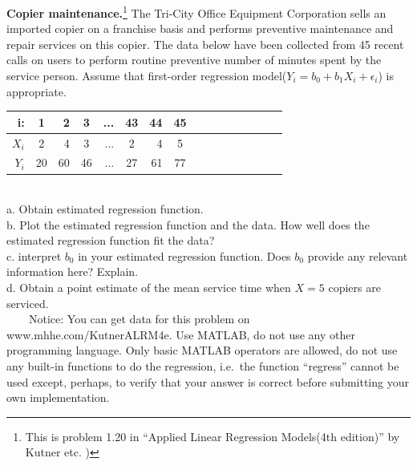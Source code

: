 \documentclass[12pt]{article}
\begin{document}
 { \textbf{Copier maintenance.}\footnote[1]{This is
problem 1.20 in ``Applied Linear Regression Models(4th edition)'' by
Kutner etc. )} The Tri-City Office Equipment Corporation sells an
imported copier on a franchise basis and performs preventive
maintenance and repair services on this copier. The data below have
been collected from 45 recent calls on users to perform routine
preventive number of minutes spent by the service person. Assume
that first-order regression model($Y_i=b_0+b_1 X_i+\epsilon_i$) is
appropriate.
\begin{table}[htdp]
\begin{center}
\begin{tabular}{rcrcrcrcrcrcrcrc}
\textbf{i:} &\textbf{1} &\textbf{2}& \textbf{3}&...&\textbf{43}&\textbf{44}&\textbf{45}\\
\hline \textbf{$X_i$} &2 &4 &3 &... &2 &4 &5\\
\textbf{$Y_i$} &20 &60 &46 &... &27 &61 &77
\end{tabular}
\end{center}
\end{table}\\

a. Obtain estimated regression function.\\
b. Plot the estimated regression function and the data. How well
does the estimated regression function fit the data?\\
c. interpret $b_0$ in your estimated regression function. Does $b_0$
provide any relevant information here? Explain.\\
d. Obtain a point estimate of the mean service time when $X=5$
copiers are serviced.\\
\indent~~~~Notice: You can get data for this problem on
www.mhhe.com/KutnerALRM4e. Use MATLAB, do not
use any other programming language. Only basic MATLAB operators are
allowed, do not use any built-in functions to do the regression, i.e.~the function ``regress'' cannot be used except, perhaps, to verify that your answer is correct before submitting your own implementation. \\}
\end{document}
